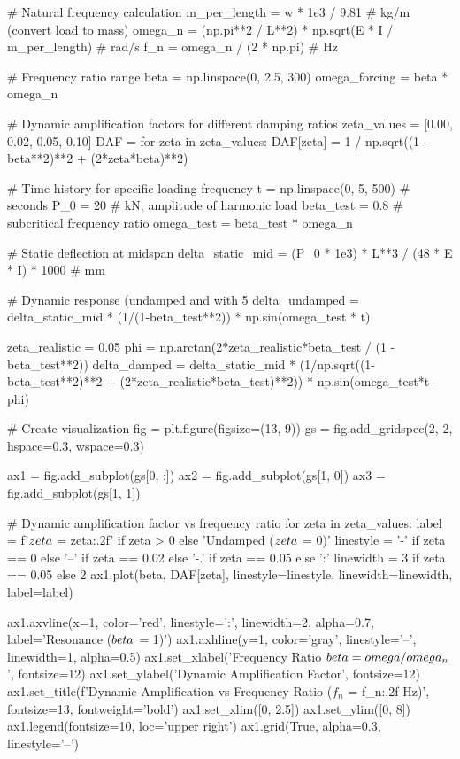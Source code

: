 \documentclass[11pt,a4paper]{article}
\begin{document}
\begin{pycode}
# Natural frequency calculation
m_per_length = w * 1e3 / 9.81  # kg/m (convert load to mass)
omega_n = (np.pi**2 / L**2) * np.sqrt(E * I / m_per_length)  # rad/s
f_n = omega_n / (2 * np.pi)  # Hz

# Frequency ratio range
beta = np.linspace(0, 2.5, 300)
omega_forcing = beta * omega_n

# Dynamic amplification factors for different damping ratios
zeta_values = [0.00, 0.02, 0.05, 0.10]
DAF = {}
for zeta in zeta_values:
    DAF[zeta] = 1 / np.sqrt((1 - beta**2)**2 + (2*zeta*beta)**2)

# Time history for specific loading frequency
t = np.linspace(0, 5, 500)  # seconds
P_0 = 20  # kN, amplitude of harmonic load
beta_test = 0.8  # subcritical frequency ratio
omega_test = beta_test * omega_n

# Static deflection at midspan
delta_static_mid = (P_0 * 1e3) * L**3 / (48 * E * I) * 1000  # mm

# Dynamic response (undamped and with 5%
delta_undamped = delta_static_mid * (1/(1-beta_test**2)) * np.sin(omega_test * t)

zeta_realistic = 0.05
phi = np.arctan(2*zeta_realistic*beta_test / (1 - beta_test**2))
delta_damped = delta_static_mid * (1/np.sqrt((1-beta_test**2)**2 + (2*zeta_realistic*beta_test)**2)) * np.sin(omega_test*t - phi)

# Create visualization
fig = plt.figure(figsize=(13, 9))
gs = fig.add_gridspec(2, 2, hspace=0.3, wspace=0.3)

ax1 = fig.add_subplot(gs[0, :])
ax2 = fig.add_subplot(gs[1, 0])
ax3 = fig.add_subplot(gs[1, 1])

# Dynamic amplification factor vs frequency ratio
for zeta in zeta_values:
    label = f'$\\zeta$ = {zeta:.2f}' if zeta > 0 else 'Undamped ($\\zeta$ = 0)'
    linestyle = '-' if zeta == 0 else '--' if zeta == 0.02 else '-.' if zeta == 0.05 else ':'
    linewidth = 3 if zeta == 0.05 else 2
    ax1.plot(beta, DAF[zeta], linestyle=linestyle, linewidth=linewidth, label=label)

ax1.axvline(x=1, color='red', linestyle=':', linewidth=2, alpha=0.7, label='Resonance ($\\beta$ = 1)')
ax1.axhline(y=1, color='gray', linestyle='--', linewidth=1, alpha=0.5)
ax1.set_xlabel('Frequency Ratio $\\beta = \\omega/\\omega_n$', fontsize=12)
ax1.set_ylabel('Dynamic Amplification Factor', fontsize=12)
ax1.set_title(f'Dynamic Amplification vs Frequency Ratio ($f_n$ = {f_n:.2f} Hz)', fontsize=13, fontweight='bold')
ax1.set_xlim([0, 2.5])
ax1.set_ylim([0, 8])
ax1.legend(fontsize=10, loc='upper right')
ax1.grid(True, alpha=0.3, linestyle='--')


\end{pycode}
\end{document}

